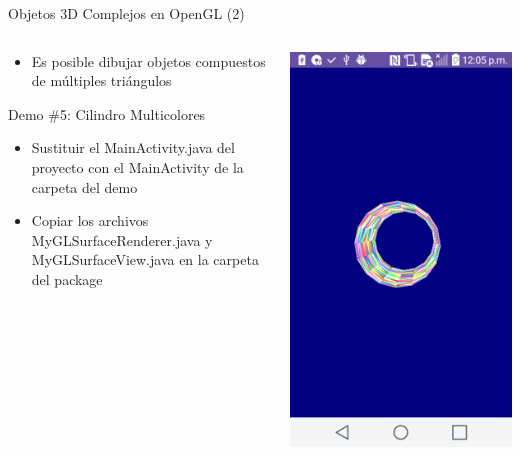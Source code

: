 \documentclass[aspectratio=169,compress]{beamer}
\begin{document}
\begin{frame}{Objetos 3D Complejos en OpenGL (2)}
\begin{columns}
\begin{column}{0.7\textwidth}

\begin{itemize}
\item Es posible dibujar objetos compuestos de múltiples triángulos
\end{itemize}
\begin{block}{Demo \#5: Cilindro Multicolores}
\begin{itemize}
\item Sustituir el MainActivity.java del proyecto con el MainActivity de la carpeta del demo
\item Copiar los archivos MyGLSurfaceRenderer.java y MyGLSurfaceView.java en la carpeta del package
\end{itemize}
\end{block}
\end{column}
\begin{column}{0.3\textwidth}
\begin{center}
\includegraphics[width=1.0\linewidth]{PantallazosDemoTaller/Demo5.png}

\end{center}
\end{column}
\end{columns}
\end{frame}
\end{document}
